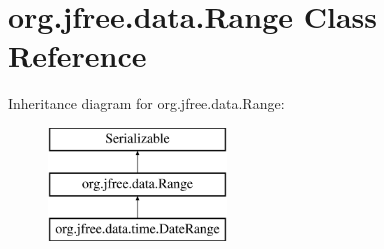 \hypertarget{classorg_1_1jfree_1_1data_1_1_range}{}\section{org.\+jfree.\+data.\+Range Class Reference}
\label{classorg_1_1jfree_1_1data_1_1_range}
Inheritance diagram for org.\+jfree.\+data.\+Range\+:\begin{figure}[H]
\begin{center}
\leavevmode
\includegraphics[height=3.000000cm]{classorg_1_1jfree_1_1data_1_1_range}
\end{center}
\end{figure}
